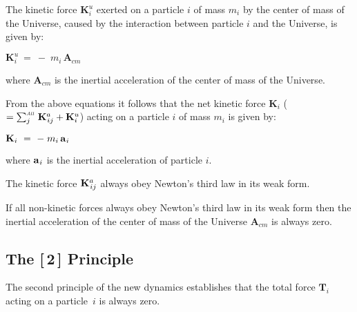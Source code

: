 \documentclass[10pt]{article}
\begin{document}
\par \bigskip \noindent The kinetic force ${\mathbf{K}}^{u}_{i}$ exerted on a particle $i$ of mass $m_i$ by the center of mass of the Universe, caused by the interaction between particle $i$ and the Universe, is given by:

\par \bigskip ${\mathbf{K}}^{u}_{i} ~=~ - \; m_i \, {\mathbf{A}}_{cm}$

\par \bigskip \noindent where ${\mathbf{A}}_{cm}$ is the inertial acceleration of the center of mass of the Universe.

\par \bigskip \noindent From the above equations it follows that the net kinetic force ${\mathbf{K}}_{i}$ \hbox {(\hspace{+0.240em}$ = \sum_{j}^{\scriptscriptstyle{\mathit{All}}} \, {\mathbf{K}}^{a}_{\hspace{+0.060em}ij} + {\mathbf{K}}^{u}_{i}$\hspace{+0.240em})} acting on a particle $i$ of mass $m_i$ is given by:

\par \bigskip ${\mathbf{K}}_{i} ~=~ - \; m_i \, {\mathbf{a}}_{\hspace{+0.045em}i}$

\par \bigskip \noindent where ${\mathbf{a}}_{\hspace{+0.045em}i}$ is the inertial acceleration of particle $i$.

\par \bigskip \noindent The kinetic force ${\mathbf{K}}^{a}_{\hspace{+0.060em}ij}$ always obey Newton's third law in its weak form.

\par \bigskip \noindent If all non-kinetic forces always obey Newton's third law in its weak form then the inertial acceleration of the center of mass of the Universe ${\mathbf{A}}_{cm}$ is always zero.

\vspace{+1.65em}

\par {\centering\subsection*{The [$\,$2$\,$] Principle}}

\par \bigskip\smallskip \noindent The second principle of the new dynamics establishes that the total force ${\mathbf{T}}_i$ acting on a \hbox {particle $i$} is always zero.
\end{document}
